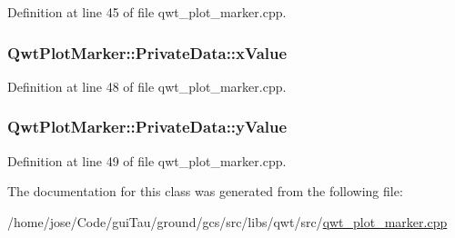 Definition at line 45 of file qwt\-\_\-plot\-\_\-marker.\-cpp.

\hypertarget{class_qwt_plot_marker_1_1_private_data_a377a13e7dcf76a7392a7312137502980}{
\subsubsection[{x\-Value}]{ Qwt\-Plot\-Marker\-::\-Private\-Data\-::x\-Value}}\label{class_qwt_plot_marker_1_1_private_data_a377a13e7dcf76a7392a7312137502980}


Definition at line 48 of file qwt\-\_\-plot\-\_\-marker.\-cpp.

\hypertarget{class_qwt_plot_marker_1_1_private_data_adea55821900c61a18b11e424037d5213}{
\subsubsection[{y\-Value}]{ Qwt\-Plot\-Marker\-::\-Private\-Data\-::y\-Value}}\label{class_qwt_plot_marker_1_1_private_data_adea55821900c61a18b11e424037d5213}


Definition at line 49 of file qwt\-\_\-plot\-\_\-marker.\-cpp.



The documentation for this class was generated from the following file\-:\begin{DoxyCompactItemize}
\item 
/home/jose/\-Code/gui\-Tau/ground/gcs/src/libs/qwt/src/\hyperlink{qwt__plot__marker_8cpp}{qwt\-\_\-plot\-\_\-marker.\-cpp}\end{DoxyCompactItemize}
